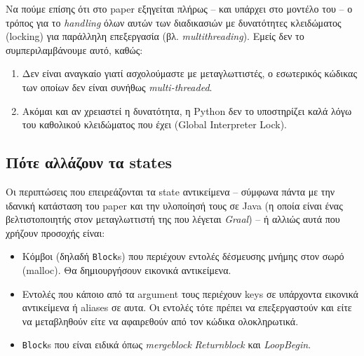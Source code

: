 Να πούμε επίσης ότι στο paper εξηγείται πλήρως – και υπάρχει στο μοντέλο του – ο
τρόπος για το \textit{handling} όλων αυτών των διαδικασιών με δυνατότητες
κλειδώματος (locking) για παράλληλη επεξεργασία (βλ. \textit{multithreading}).
Εμείς δεν το συμπεριλαμβάνουμε αυτό, καθώς:

\begin{enumerate}

\item Δεν είναι αναγκαίο γιατί ασχολούμαστε με μεταγλωττιστές, ο εσωτερικός
κώδικας των οποίων δεν είναι συνήθως \textit{multi-threaded}.

\item Ακόμαι και αν χρειαστεί η δυνατότητα, η Python δεν το υποστηρίζει καλά
λόγω του καθολικού κλειδώματος που έχει (Global Interpreter Lock).

\end{enumerate}


\subsection{Πότε αλλάζουν τα states}

Οι περιπτώσεις που επειρεάζονται τα state αντικείμενα – σύμφωνα πάντα με την
ιδανική κατάσταση του paper\cite{standler2014partial} και την υλοποίησή τους σε
Java (η οποία είναι ένας βελτιστοποιητής στον μεταγλωττιστή της που λέγεται
\textit{Graal}) – ή αλλιώς αυτά που χρήζουν προσοχής είναι:

\begin{itemize}

\item Κόμβοι (δηλαδή \texttt{Block}s) που περιέχουν εντολές δέσμευσης μνήμης
στον σωρό (malloc). Θα δημιουργήσουν εικονικά αντικείμενα.

\item Εντολές που κάποιο από τα argument τους περιέχουν keys σε υπάρχοντα
εικονικά αντικείμενα ή aliases σε αυτα. Οι εντολές τότε πρέπει να επεξεργαστούν
και είτε να μεταβληθούν είτε να αφαιρεθούν από τον κώδικα ολοκληρωτικά.

\item \texttt{Block}s που είναι ειδικά όπως \textit{mergeblock}
\textit{Returnblock} και \textit{LoopBegin}.

\end{itemize}


